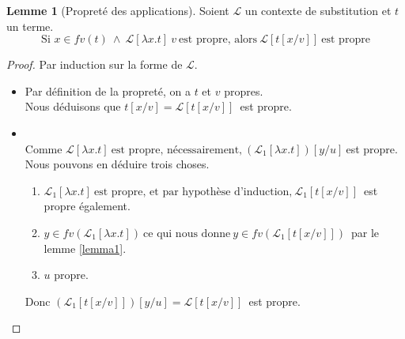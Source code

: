 \documentclass[11pt,a4paper]{article}
\theoremstyle{definition}
\newtheorem{lemma}[theorem]{Lemme}
\begin{document}
\begin{lemma}[Propreté des applications]
  \label{prdb}
  Soient $\mathcal{L}$ un contexte de substitution et $t$ un terme.
 \[
  \text{Si }x\in fv(t)~\wedge~\mathcal{L}[\lambda x.t]~v~\text{est propre, alors}~\mathcal{L}[t[x/v]]~\text{est propre}
 \]
\end{lemma}
\begin{proof}
  Par induction sur la forme de $\mathcal{L}$.
  \begin{itemize}
    \item {} Par définition de la propreté, on a $t$ et $v$ propres.\\
      Nous déduisons que $t[x/v] = \mathcal{L}[t[x/v]]$~est propre.
    \item {}\\
      Comme $\mathcal{L}[\lambda x.t]~\text{est propre, nécessairement,}~(\mathcal{L}_1[\lambda x.t])[y/u]~$est propre. Nous pouvons en déduire trois choses.
      \begin{enumerate}
        \item $\mathcal{L}_1[\lambda x.t]~\text{est propre, et par hypothèse d'induction,}~\mathcal{L}_1[t[x/v]]$~est propre également.
        \item $y\in fv(\mathcal{L}_1[\lambda x.t])~\text{ce qui nous donne}~y \in fv(\mathcal{L}_1[t[x/v]])$~par le lemme \ref{lemma1}.
        \item $u$ propre.
      \end{enumerate}
      Donc $(\mathcal{L}_1[t[x/v]])[y/u] = \mathcal{L}[t[x/v]]$~est propre.
  \end{itemize}
\end{proof}
\end{document}
